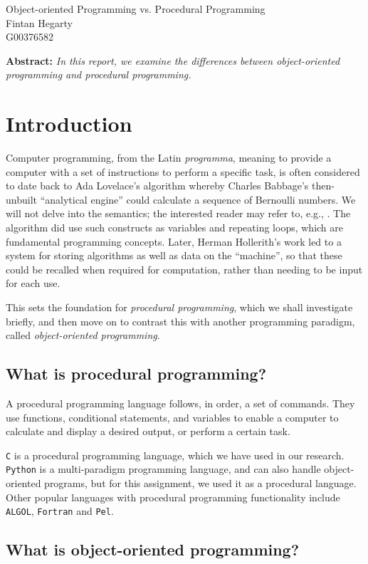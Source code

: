 \documentclass{article}
\begin{document}
\begin{center}
\Large{Object-oriented Programming vs. Procedural Programming}\\
\smallbreak
\large{Fintan Hegarty}\\
\smallbreak
\large{G00376582}
\end{center}
\bigskip
\textbf{Abstract:} \textit{In this report, we examine the differences between object-oriented programming and procedural programming.}
\tableofcontents
\section{Introduction}
Computer programming, from the Latin \emph{programma}, meaning to provide a computer with a set of instructions to perform a specific task, is often considered to date back to Ada Lovelace's algorithm \cite{wikicp} whereby Charles Babbage's then-unbuilt ``analytical engine'' could calculate a sequence of Bernoulli numbers. We will not delve into the semantics; the interested reader may refer to, e.g., \cite{twobithistory}. The algorithm did use such constructs as variables and repeating loops, which are fundamental programming concepts. Later, Herman Hollerith's work \cite{colombia} led to a system for storing algorithms as well as data on the ``machine'', so that these could be recalled when required for computation, rather than needing to be input for each use.

This sets the foundation for \emph{procedural programming}, which we shall investigate briefly, and then move on to contrast this with another programming paradigm, called \emph{object-oriented programming}.

\subsection{What is procedural programming?}
A procedural programming language follows, in order, a set of commands. They use functions, conditional statements, and variables to enable a computer to calculate and display a desired output, or perform a certain task. 

\texttt{C} is a procedural programming language, which we have used in our research.  
\texttt{Python} is a multi-paradigm programming language, and can also handle object-oriented programs, but for this assignment, we used it as a procedural language. Other popular languages with procedural programming functionality include \texttt{ALGOL}, \texttt{Fortran} and \texttt{Pel}.
\subsection{What is object-oriented programming?}
\end{document}
